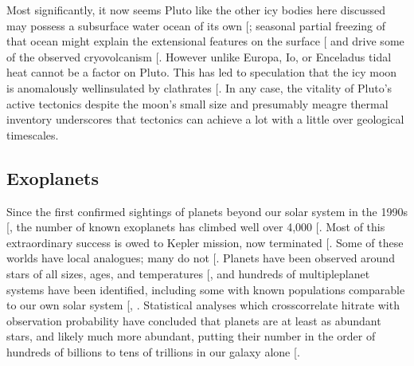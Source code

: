\documentclass[letterpaper,10pt,english]{jupyterBook}
\begin{document}
\sphinxAtStartPar
Most significantly, it now seems Pluto \sphinxhyphen{} like the other icy bodies here discussed \sphinxhyphen{} may possess a subsurface water ocean of its own {[}\sphinxcite{references:id145}{]}; seasonal partial freezing of that ocean might explain the extensional features on the surface {[}\sphinxcite{references:id155}{]} and drive some of the observed cryovolcanism {[}\sphinxcite{references:id299}{]}. However \sphinxhyphen{} unlike Europa, Io, or Enceladus \sphinxhyphen{} tidal heat cannot be a factor on Pluto. This has led to speculation that the icy moon is anomalously well\sphinxhyphen{}insulated by clathrates {[}\sphinxcite{references:id142}{]}. In any case, the vitality of Pluto’s active tectonics despite the moon’s small size and presumably meagre thermal inventory underscores that tectonics can achieve a lot with a little over geological timescales.


\subsection{Exoplanets}
\label{\detokenize{content/chapter_01_background/main:exoplanets}}
\sphinxAtStartPar
Since the first confirmed sightings of planets beyond our solar system in the 1990s {[}, \sphinxcite{references:id469}{]} the number of known exoplanets has climbed well over 4,000 {[}\sphinxcite{references:id462}{]}. Most of this extraordinary success is owed to Kepler mission, now terminated {[}\sphinxcite{references:id212}{]}. Some of these worlds have local analogues; many do not {[}\sphinxcite{references:id474}{]}. Planets have been observed around stars of all sizes, ages, and temperatures {[}\sphinxcite{references:id215}{]}, and hundreds of multiple\sphinxhyphen{}planet systems have been identified, including some with known populations comparable to our own solar system {[}, \sphinxcite{references:id465}{]}. Statistical analyses which cross\sphinxhyphen{}correlate hit\sphinxhyphen{}rate with observation probability have concluded that planets are at least as abundant stars, and likely much more abundant, putting their number in the order of hundreds of billions to tens of trillions in our galaxy alone {[}\sphinxcite{references:id467}{]}.
\end{document}
